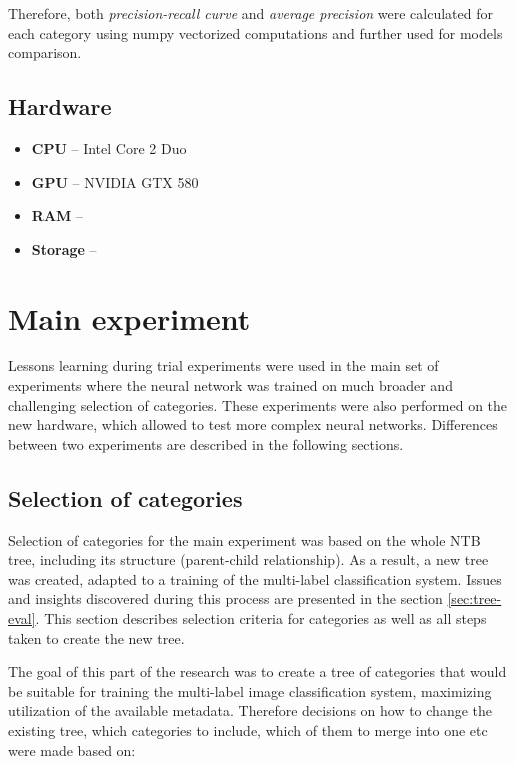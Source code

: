     Therefore, both \textit{precision-recall curve} and \textit{average precision} were calculated for each category using numpy vectorized computations and further used for models comparison.
    
    \subsection{Hardware}
    \label{sec:trial-hw}
    \begin{itemize}
        \item \textbf{CPU} -- Intel Core 2 Duo
        \item \textbf{GPU} -- NVIDIA GTX 580
        \item \textbf{RAM} -- 
        \item \textbf{Storage} -- 
    \end{itemize}


\section{Main experiment}
    Lessons learning during trial experiments were used in the main set of experiments where the neural network was trained on much broader and challenging selection of categories. These experiments were also performed on the new hardware, which allowed to test more complex neural networks. Differences between two experiments are described in the following sections.
    
    \subsection{Selection of categories}
    Selection of categories for the main experiment was based on the whole NTB tree, including its structure (parent-child relationship). As a result, a new tree was created, adapted to a training of the multi-label classification system. Issues and insights discovered during this process are presented in the section \ref{sec:tree-eval}. This section describes selection criteria for categories as well as all steps taken to create the new tree.
    
    The goal of this part of the research was to create a tree of categories that would be suitable for training the multi-label image classification system, maximizing utilization of the available metadata. Therefore decisions on how to change the existing tree, which categories to include, which of them to merge into one etc were made based on:
    
